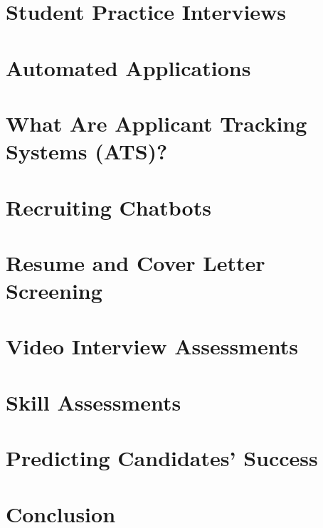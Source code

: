 \documentclass[
]{book}
\begin{document}
\hypertarget{student-practice-interviews}{%
\chapter{Student Practice Interviews}\label{student-practice-interviews}}

\hypertarget{automated-applications}{%
\chapter{Automated Applications}\label{automated-applications}}

\hypertarget{what-are-applicant-tracking-systems-ats}{%
\chapter{What Are Applicant Tracking Systems (ATS)?}\label{what-are-applicant-tracking-systems-ats}}

\hypertarget{recruiting-chatbots}{%
\chapter{Recruiting Chatbots}\label{recruiting-chatbots}}

\hypertarget{resume-and-cover-letter-screening}{%
\chapter{Resume and Cover Letter Screening}\label{resume-and-cover-letter-screening}}

\hypertarget{video-interview-assessments}{%
\chapter{Video Interview Assessments}\label{video-interview-assessments}}

\hypertarget{skill-assessments}{%
\chapter{Skill Assessments}\label{skill-assessments}}

\hypertarget{predicting-candidates-success}{%
\chapter{Predicting Candidates' Success}\label{predicting-candidates-success}}

\hypertarget{conclusion}{%
\chapter{Conclusion}\label{conclusion}}
\end{document}
